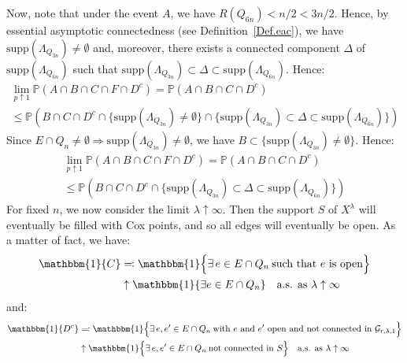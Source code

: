 \documentclass[10pt,a4paper]{amsart}
\theoremstyle{exampstyle}
\theoremstyle{exampnotations}
\begin{document}
Now, note that under the event $A$, we have $R(Q_{6n}) < n/2 < 3n/2$. Hence, by essential asymptotic connectedness (see Definition~\ref{Def.eac}), we have $\text{supp}(\Lambda_{Q_{3n}}) \neq \emptyset$ and, moreover, there exists a connected component $\Delta$ of $\text{supp}(\Lambda_{Q_{6n}})$ such that $\text{supp}(\Lambda_{Q_{3n}}) \subset \Delta \subset \text{supp}(\Lambda_{Q_{6n}})$. Hence:
\begin{gather*}
    \lim_{p \uparrow 1} \mathbb{P}(A \cap B \cap C \cap F \cap D^{c})  = \mathbb{P}(A \cap B \cap C \cap D^c)  \\ \leq \mathbb{P}\left(B \cap C \cap D^c \cap \Big\lbrace \text{supp}(\Lambda_{Q_{3n}}) \neq \emptyset \Big\rbrace \cap \Big\lbrace \text{supp}(\Lambda_{Q_{3n}}) \subset \Delta \subset \text{supp}(\Lambda_{Q_{6n}}) \Big\rbrace \right)
\end{gather*}
Since $E \cap Q_n \neq \emptyset \Rightarrow \text{supp}(\Lambda_{Q_{3n}}) \neq \emptyset$, we have $B \subset \Big\lbrace \text{supp}(\Lambda_{Q_{3n}}) \neq \emptyset \Big\rbrace$. Hence:
\begin{gather*}
    \lim_{p \uparrow 1} \mathbb{P}(A \cap B \cap C \cap F \cap D^{c})  = \mathbb{P}(A \cap B \cap C \cap D^c)  \\ \leq \mathbb{P}\left(B \cap C \cap D^c  \cap \Big\lbrace \text{supp}(\Lambda_{Q_{3n}}) \subset \Delta \subset \text{supp}(\Lambda_{Q_{6n}}) \Big\rbrace \right)
\end{gather*}
For fixed $n$, we now consider the limit $\lambda \uparrow \infty$. Then the support $S$ of $X^{\lambda}$ will eventually be filled with Cox points, and so all edges will eventually be open. As a matter of fact, we have:
\begin{align*}
    \mathbbm{1} \lbrace C \rbrace &\eqqcolon \mathbbm{1} \Big\lbrace \exists \, e \in E\cap Q_n \: \text{such that $e$ is open} \Big\rbrace 
    \\ &\uparrow \mathbbm{1} \lbrace \exists e \in E\cap Q_n \rbrace \quad \text{a.s. as $\lambda \uparrow \infty$}
\end{align*}
and: \begin{align*}
     \mathbbm{1} \lbrace D^c \rbrace &\eqqcolon \mathbbm{1} \Big\lbrace \exists \, e,e' \in E\cap Q_n \: \text{with $e$ and $e'$ open and not connected in } \mathcal{G}_{r,\lambda,1}  \Big\rbrace 
     \\ &\uparrow \mathbbm{1} \Big\lbrace \exists \, e,e' \in E\cap Q_n \: \text{not connected in } S  \Big\rbrace \quad \text{a.s. as $\lambda \uparrow \infty$}
\end{align*}
\end{document}
